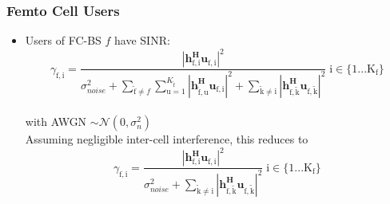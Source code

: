 \documentclass[12pt]{article}
\begin{document}
\subsubsection{Femto Cell Users}
\begin{itemize}



\item Users of FC-BS $f$ have SINR:
	\begin{equation*}
	\gamma_{\mathrm{f,i}} = \frac{|\mathbf{h^H_{\mathrm{f,i}}u_{\mathrm{f,i}}}|^2}
	{\sigma^2_{noise}   + \sum_{\mathrm{\tilde{f}}\neq f} \sum_{\mathrm{u=1}
	}^{K_{\mathrm{\tilde{f}}}}
	|\mathbf{h^H_{\mathrm{\tilde{f},u}}u_{\mathrm{f,i}}}|^2
	 + \sum_{\mathrm{\tilde{k}\neq i}}
	  |\mathbf{h^H_{\mathrm{f,\tilde{k}}}u_{\mathrm{f,\tilde{k}}}}|^2}
	  \; \mathrm{i \in \{1 ... K_f\}}\end{equation*}
\\
with AWGN $\sim \mathcal{N}(0,\sigma^2_n)$
\\

Assuming negligible inter-cell interference, this reduces to
	\begin{equation*}
	\gamma_{\mathrm{f,i}} = \frac{|\mathbf{h^H_{\mathrm{f,i}}u_{\mathrm{f,i}}}|^2}
	{\sigma^2_{noise} 
	 + \sum_{\mathrm{\tilde{k}\neq i}}
	  |\mathbf{h^H_{\mathrm{f,\tilde{k}}}u_{\mathrm{f,\tilde{k}}}}|^2}
	  \; \mathrm{i \in \{1 ... K_f\}}
	\end{equation*}
\\

%

\end{itemize}


%
%
\end{document}
